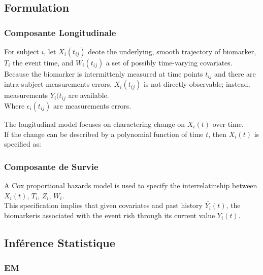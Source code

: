 \documentclass[11pt]{article} %
\begin{document}
\par{}

\subsection{Formulation}
\par{}

\subsubsection{Composante Longitudinale}
\par{
For subject $i$, let $X_i(t_{ij})$ deote the underlying, smooth trajectory of biomarker, $T_i$ the event time, and $W_i(t_{ij})$ a set of possibly time-varying covariates.\\
Because the biomarker is intermittenly measured at time points $t_{ij}$ and there are intra-subject measurements errors, $X_i(t_{ij})$ is not directly observable; instead, measurements $Y_i(t_{ij}$ are available.\\
Where $\epsilon_{i}(t_{ij})$ are measurements errors.
}
\par{
The longitudinal model focuses on charactering change on $X_i(t)$ over time.\\
If the change can be described by a polynomial function of time $t$, then $X_i(t)$ is specified as:
}

\subsubsection{Composante de Survie}
\par{
A Cox proportional hazards model is used to specify the interrelatinship between $X_i(t)$, $T_i$, $Z_i$, $W_i$.\\

This specification implies that given covariates and past history $\bar{Y_i}(t)$, the biomarkeris associated with the event rish through its current value $Y_i(t)$.
}

\subsection{Inférence Statistique}
\subsubsection{EM}
\par{}
\end{document}
